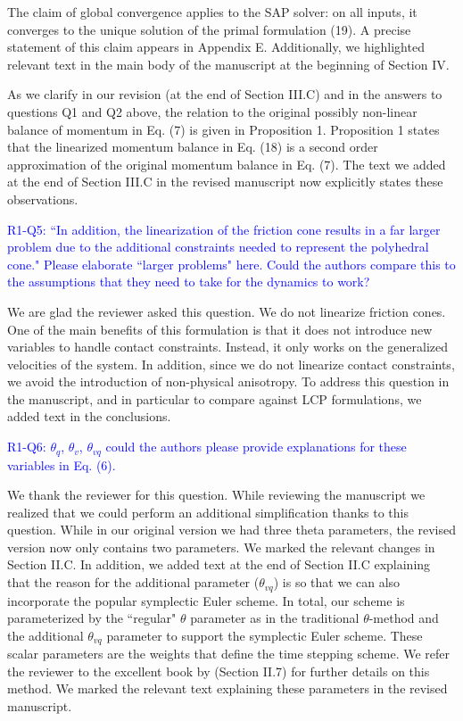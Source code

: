 The claim of global convergence applies to the SAP solver: on all inputs, it
converges to the unique solution of the primal formulation (19). A precise
statement of this claim appears in Appendix E. Additionally, we highlighted
relevant text in the main body of the manuscript at the beginning of Section IV.

As we clarify in our revision (at the end of Section III.C) and in the answers
to questions Q1 and Q2 above, the relation to the original possibly non-linear
balance of momentum in Eq. (7) is given in Proposition 1. Proposition 1 states
that the linearized momentum balance in Eq. (18) is a second order approximation
of the original momentum balance in Eq. (7). The text we added at the end of
Section III.C in the revised manuscript now explicitly states these
observations.
\vspace{5mm}

\textcolor{blue}{R1-Q5: ``In addition, the linearization of the friction cone
results in a far larger problem due to the additional constraints needed to
represent the polyhedral cone." Please elaborate ``larger problems" here. Could
the authors compare this to the assumptions that they need to take for the
dynamics to work?}

We are glad the reviewer asked this question. We do not linearize friction
cones. One of the main benefits of this formulation is that it does not
introduce new variables to handle contact constraints. Instead, it only works on
the generalized velocities of the system. In addition, since we do not linearize
contact constraints, we avoid the introduction of non-physical anisotropy. To
address this question in the manuscript, and in particular to compare against
LCP formulations, we added text in the conclusions.
\vspace{5mm}

\textcolor{blue}{R1-Q6: $\theta_q$, $\theta_v$, $\theta_{vq}$ could the authors
please provide explanations for these variables in Eq. (6).}

We thank the reviewer for this question. While reviewing the manuscript we
realized that we could perform an additional simplification thanks to this
question. While in our original version we had three theta parameters, the
revised version now only contains two parameters. We marked the relevant changes
in Section II.C. In addition, we added text at the end of Section II.C
explaining that the reason for the additional parameter ($\theta_{vq}$) is so
that we can also incorporate the popular symplectic Euler scheme. In total, our
scheme is parameterized by the ``regular" $\theta$ parameter as in the
traditional $\theta$-method and the additional $\theta_{vq}$ parameter to
support the symplectic Euler scheme. These scalar parameters are the weights
that define the time stepping scheme. We refer the reviewer to the excellent
book by
\cite{bib:hairer2008solving}
(Section II.7) for further details on this method. We marked the relevant text
explaining these parameters in the revised manuscript.
\vspace{5mm}

